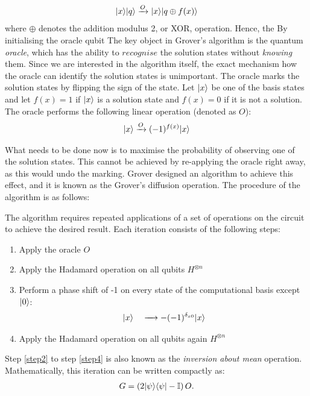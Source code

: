 \documentclass[bibliography=totocnumbered, 10pt]{article}
\theoremstyle{NoticeStyle}
\begin{document}
\begin{align}
	{\left\vert{x}\right\rangle} {\left\vert{q}\right\rangle} \xrightarrow{O} {\left\vert{x}\right\rangle} {\left\vert{q \oplus f(x)}\right\rangle}
\end{align}
where $\oplus$ denotes the addition modulus 2, or XOR, operation. Hence, the
By initialising the oracle qubit
The key object in Grover's algorithm is the quantum \emph{oracle}, which has the ability to $recognise$ the solution states without \emph{knowing} them. Since we are interested in the algorithm itself, the exact mechanism how the oracle can identify the solution states is unimportant. The oracle marks the solution states by flipping the sign of the state.  Let ${\left\vert{x}\right\rangle}$ be one of the basis states and let $f(x) = 1$ if ${\left\vert{x}\right\rangle}$ is a solution state and $f(x) = 0$ if it is not a solution. The oracle performs the following linear operation (denoted as $O$):
\begin{align}
	{\left\vert{x}\right\rangle} \xrightarrow{O} (-1)^{f(x)}{\left\vert{x}\right\rangle}
\end{align}

What needs to be done now is to maximise the probability of observing one of the solution states. This cannot be achieved by re-applying the oracle right away, as this would undo the marking. Grover designed an algorithm to achieve this effect, and it is known as the Grover's diffusion operation. The procedure of the algorithm is as follows:


The algorithm requires repeated applications of a set of operations on the circuit to achieve the desired result. Each iteration consists of the following steps:

\begin{enumerate}

	\item Apply the oracle $O$
	\item Apply the Hadamard operation on all qubits $H^{\otimes n}$ \label{step2}
	\item Perform a phase shift of -1 on every state of the computational basis except ${\left\vert{0}\right\rangle}$:
		\begin{align}
			{\left\vert{x}\right\rangle} \quad 
			\xrightarrow 
			\quad -(-1)^{\delta_{x0}}{\left\vert{x}\right\rangle}
		\end{align}
	\item Apply the Hadamard operation on all qubits again $H^{\otimes n}$ \label{step4}
\end{enumerate}
Step \ref{step2} to step \ref{step4} is also known as the \emph{inversion about mean} operation. Mathematically, this iteration can be written compactly as:
\begin{align}
	G = \left(2{\left\vert{\psi}\right\rangle}{\left\langle{\psi}\right\vert} - \mathbb{I}\right)O.
\end{align}
\end{document}
